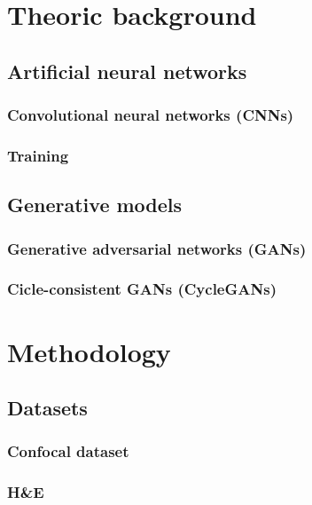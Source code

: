 \documentclass{beamer}
\begin{document}
\section{Theoric background}

\subsection{Artificial neural networks}

\begin{frame}
\frametitle{Convolutional neural networks (CNNs)}
\end{frame}

\begin{frame}
\frametitle{Training}
\end{frame}

\subsection{Generative models}

\begin{frame}
\frametitle{Generative adversarial networks (GANs)}
\end{frame}

\begin{frame}
\frametitle{Cicle-consistent GANs (CycleGANs)}
\end{frame}


\section{Methodology}

\subsection{Datasets}

\begin{frame}
\frametitle{Confocal dataset}
\end{frame}

\begin{frame}
\frametitle{H\&E}
\end{frame}
\end{document}
